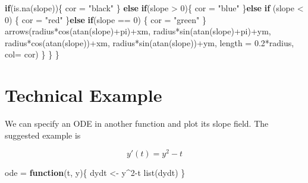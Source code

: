 \documentclass[
]{book}
\newenvironment{Shaded}{\begin{snugshade}}{\end{snugshade}}
\newcommand{\AttributeTok}[1]{\textcolor[rgb]{0.77,0.63,0.00}{#1}}
\newcommand{\ControlFlowTok}[1]{\textcolor[rgb]{0.13,0.29,0.53}{\textbf{#1}}}
\newcommand{\DecValTok}[1]{\textcolor[rgb]{0.00,0.00,0.81}{#1}}
\newcommand{\FloatTok}[1]{\textcolor[rgb]{0.00,0.00,0.81}{#1}}
\newcommand{\FunctionTok}[1]{\textcolor[rgb]{0.00,0.00,0.00}{#1}}
\newcommand{\NormalTok}[1]{#1}
\newcommand{\OtherTok}[1]{\textcolor[rgb]{0.56,0.35,0.01}{#1}}
\newcommand{\SpecialCharTok}[1]{\textcolor[rgb]{0.00,0.00,0.00}{#1}}
\newcommand{\StringTok}[1]{\textcolor[rgb]{0.31,0.60,0.02}{#1}}
\begin{document}
\begin{Shaded}
\begin{Highlighting}[]
      \ControlFlowTok{if}\NormalTok{(}\FunctionTok{is.na}\NormalTok{(slope))\{}
\NormalTok{        cor }\OtherTok{=} \StringTok{"black"}
\NormalTok{      \} }\ControlFlowTok{else} \ControlFlowTok{if}\NormalTok{(slope }\SpecialCharTok{\textgreater{}} \DecValTok{0}\NormalTok{)\{}
\NormalTok{        cor }\OtherTok{=} \StringTok{"blue"}
\NormalTok{      \}}\ControlFlowTok{else} \ControlFlowTok{if}\NormalTok{ (slope }\SpecialCharTok{\textless{}} \DecValTok{0}\NormalTok{) \{}
\NormalTok{        cor }\OtherTok{=} \StringTok{"red"}
\NormalTok{      \}}\ControlFlowTok{else} \ControlFlowTok{if}\NormalTok{(slope }\SpecialCharTok{==} \DecValTok{0}\NormalTok{) \{}
\NormalTok{        cor }\OtherTok{=} \StringTok{"green"}
\NormalTok{      \}}
      \FunctionTok{arrows}\NormalTok{(radius}\SpecialCharTok{*}\FunctionTok{cos}\NormalTok{(}\FunctionTok{atan}\NormalTok{(slope)}\SpecialCharTok{+}\NormalTok{pi)}\SpecialCharTok{+}\NormalTok{xm,}
\NormalTok{             radius}\SpecialCharTok{*}\FunctionTok{sin}\NormalTok{(}\FunctionTok{atan}\NormalTok{(slope)}\SpecialCharTok{+}\NormalTok{pi)}\SpecialCharTok{+}\NormalTok{ym,}
\NormalTok{             radius}\SpecialCharTok{*}\FunctionTok{cos}\NormalTok{(}\FunctionTok{atan}\NormalTok{(slope))}\SpecialCharTok{+}\NormalTok{xm,}
\NormalTok{             radius}\SpecialCharTok{*}\FunctionTok{sin}\NormalTok{(}\FunctionTok{atan}\NormalTok{(slope))}\SpecialCharTok{+}\NormalTok{ym, }
             \AttributeTok{length =} \FloatTok{0.2}\SpecialCharTok{*}\NormalTok{radius, }\AttributeTok{col=}\NormalTok{ cor)}
\NormalTok{    \}}
\NormalTok{  \}}
\NormalTok{\}}
\end{Highlighting}
\end{Shaded}

\hypertarget{technical-example}{%
\section{Technical Example}\label{technical-example}}

We can specify an ODE in another function and plot its slope field. The suggested example is

\[y'(t) = y^2 - t \]

\begin{Shaded}
\begin{Highlighting}[]
\NormalTok{ode }\OtherTok{=} \ControlFlowTok{function}\NormalTok{(t, y)\{}
\NormalTok{  dydt }\OtherTok{\textless{}{-}}\NormalTok{ y}\SpecialCharTok{\^{}}\DecValTok{2}\SpecialCharTok{{-}}\NormalTok{t}
  \FunctionTok{list}\NormalTok{(dydt)}
\NormalTok{\}}
\end{Highlighting}
\end{Shaded}
\end{document}
